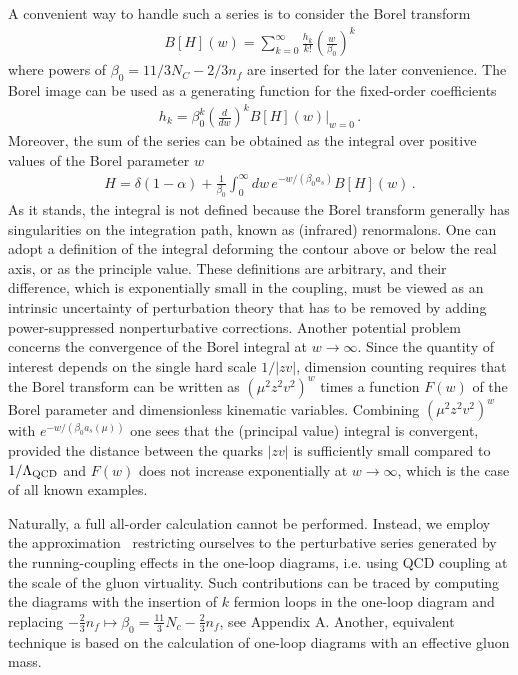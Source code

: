 A convenient way to handle such a series is to consider the Borel transform
\begin{align}
  B[H] (w) = \sum_{k=0}^\infty \frac{h_k}{k!}\left(\frac{w}{\beta_0}\right)^k 
\end{align}
where powers of $\beta_0 = 11/3 N_C -2/3 n_f$ are inserted for the later convenience. The Borel image can be used as a generating function for the fixed-order coefficients
\begin{align}
 h_k = \beta_0^k \left(\frac{d}{dw}\right)^k  B[H] (w)\big|_{w=0}\,.
\end{align}
Moreover, the sum of the series can be obtained as the integral over positive values of the Borel parameter $w$
\begin{align}
\label{BorelIntegral}
H = \delta(1-\alpha)  + \frac{1}{\beta_0} \int_0^\infty \!dw\, e^{-w/(\beta_0 a_s)} B[H](w)\,. 
\end{align}
As it stands, the integral is not defined because the Borel transform generally has singularities on the integration path, known
as (infrared) renormalons. One can adopt a definition of the integral deforming the contour above or below the real
axis, or as the principle value. These definitions are arbitrary, and their difference, which is exponentially small in the 
coupling, must be viewed as an intrinsic uncertainty of perturbation theory that has to be removed by adding 
power-suppressed nonperturbative corrections. Another potential problem concerns the convergence of the Borel integral at 
$w\to\infty$. Since the quantity of interest depends on the single hard scale $1/|z v|$, dimension counting requires that the Borel
transform can be written as $(\mu^2 z^2 v^2 )^w$ times a function $F(w)$ of the Borel parameter and dimensionless kinematic variables.
Combining $(\mu^2 z^2 v^2)^w$ with $e^{-w/(\beta_0 a_s(\mu))}$ one sees that the (principal value) integral is convergent, provided 
the distance between the quarks $|zv|$ is sufficiently small compared to $1/\Lambda_{\rm QCD}$ and $F(w)$ does not increase exponentially
at $w\to\infty$, which is the case of all known examples. 

Naturally, a full all-order calculation cannot be performed. Instead, we employ the approximation~\cite{Beneke:1998ui,Beneke:2000kc}   
restricting ourselves to the perturbative series generated by the running-coupling effects in the one-loop diagrams, i.e. 
using QCD coupling at the scale of the gluon virtuality. 
Such contributions can be traced by computing  
the diagrams with the insertion of $k$ fermion loops in the one-loop diagram
and replacing  $- \frac23 n_f \mapsto   \beta_0 = \frac{11}{3} N_c - \frac23 n_f$, see Appendix A.
Another, equivalent technique \cite{Ball:1995ni} is based on the calculation of one-loop diagrams with an effective gluon mass.

